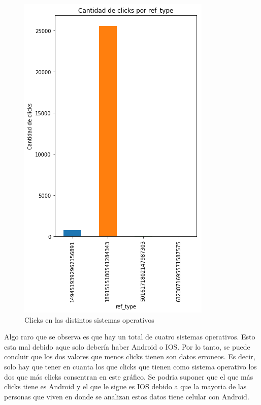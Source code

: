 \documentclass[a4paper, 12pt]{article}
\newcommand\tab[1][1cm]{\hspace*{#1}}
\begin{document}
		\FloatBarrier
		\begin{figure}[h]
			\centering
			\includegraphics[width=\textwidth]{images/clicks/clicks_ref_type.png}
			\caption{Clicks en las distintos sistemas operativos}
		\end{figure}
		\FloatBarrier

		\tab Algo raro que se observa es que hay un total de cuatro sistemas operativos. Esto esta mal debido aque solo debería haber Android o IOS. Por lo tanto, se puede concluir que los dos valores que menos clicks tienen son datos erroneos. Es decir, solo hay que tener en cuanta los que clicks que tienen como sistema operativo los dos que más clicks consentran en este gráfico. Se podria suponer que el que más clicks tiene es Android y el que le sigue es IOS debido a que la mayoria de las personas que viven en donde se analizan estos datos tiene celular con Android.
\end{document}
